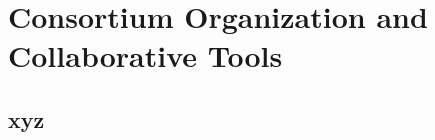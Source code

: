 \chapter{Consortium Organization and Collaborative Tools}
\label{ch:org}

\section{xyz}
\label{sec:org:xyz}  %

